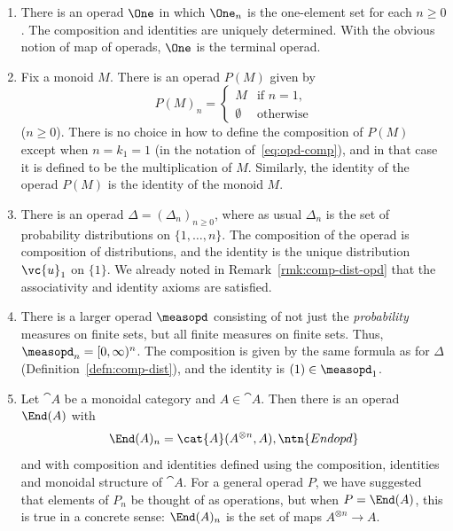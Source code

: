 \begin{examples}
\begin{enumerate}
\item 
There is an operad $\One$ in which $\One_n$ is the one-element
set for each $n \geq 0$.  The composition and identities are uniquely
determined.  With the obvious notion of map of operads, $\One$ is the
terminal%
% 
%
% 
operad.

\item
{}
Fix a monoid%
%
%
% 
$M$.  There is an operad $P(M)$ given by
\[
P(M)_n
=
\begin{cases}
M               &\text{if } n = 1,      \\
\emptyset       &\text{otherwise}
\end{cases}
\]
($n \geq 0$).  There is no choice in how to define the composition of
$P(M)$ except when $n = k_1 = 1$ (in the notation of~\eqref{eq:opd-comp}),
and in that case it is defined to be the multiplication of $M$.  Similarly,
the identity of the operad $P(M)$ is the identity of the monoid $M$.

\item
{} 
% 
There is an operad%
%
%
%
% 
$\Delta = (\Delta_n)_{n \geq 0}$, where as
usual $\Delta_n$ is the set of probability distributions on $\{1, \ldots,
n\}$.  The composition of the operad is composition of distributions,
and the identity is the unique distribution $\vc{u}_1$ on $\{1\}$.  We
already noted in Remark~\ref{rmk:comp-dist-opd} that the associativity and
identity axioms are satisfied.

\item
There is a larger operad $\measopd$ consisting of not just the
\emph{probability} measures on finite sets, but all finite measures%
%
%
% 
on finite sets.  Thus, $\measopd_n = [0, \infty)^n$.  The composition is
  given by the same formula as for $\Delta$
  (Definition~\ref{defn:comp-dist}), and the identity is $(1) \in
  \measopd_1$.

\item
{}
Let $\cat{A}$ be a monoidal category and $A \in \cat{A}$. Then there is an
operad $\End(A)$%
%
%
% 
with 
\[
\End(A)_n = \cat{A}(A^{\otimes n}, A),
\ntn{Endopd}
\]
and with composition and identities defined using the composition,
identities and monoidal structure of $\cat{A}$.  For a general operad $P$,
we have suggested that elements of $P_n$ be thought of as operations, but
when $P = \End(A)$, this is true in a concrete sense: $\End(A)_n$ is the set
of maps $A^{\otimes n} \to A$.


\end{enumerate}
\end{examples}
